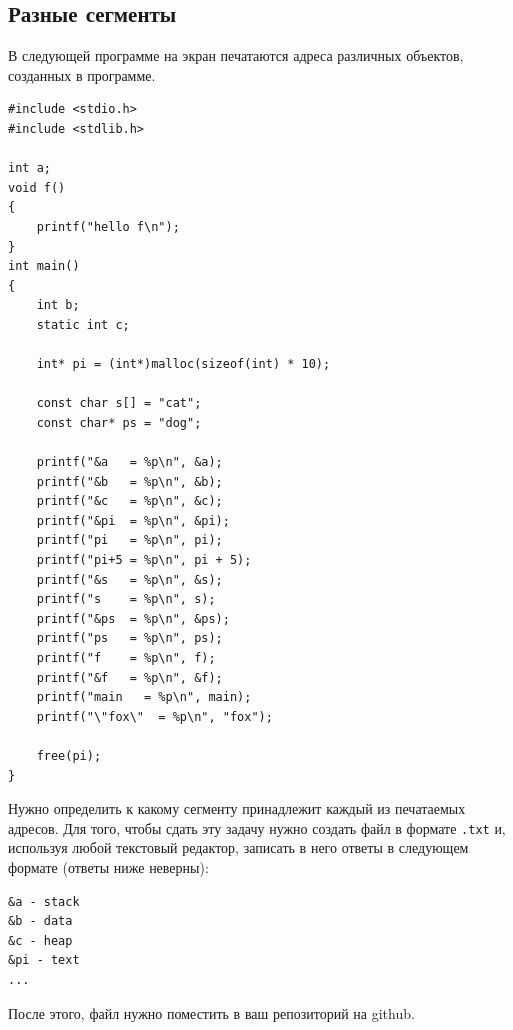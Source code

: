 \documentclass{article}
\begin{document}
\subsection{Разные сегменты}
В следующей программе на экран печатаются адреса различных объектов, созданных в программе.
\begin{lstlisting}
#include <stdio.h>
#include <stdlib.h>

int a;
void f() 
{
    printf("hello f\n");
}
int main()
{
    int b;
    static int c; 
       
    int* pi = (int*)malloc(sizeof(int) * 10);
    
    const char s[] = "cat";
    const char* ps = "dog";
    
    printf("&a   = %p\n", &a);
    printf("&b   = %p\n", &b);
    printf("&c   = %p\n", &c);
    printf("&pi  = %p\n", &pi);
    printf("pi   = %p\n", pi);
    printf("pi+5 = %p\n", pi + 5);
    printf("&s   = %p\n", &s);
    printf("s    = %p\n", s);
    printf("&ps  = %p\n", &ps);
    printf("ps   = %p\n", ps);
    printf("f    = %p\n", f);
    printf("&f   = %p\n", &f);
    printf("main   = %p\n", main);
    printf("\"fox\"  = %p\n", "fox");
    
    free(pi);
}
\end{lstlisting}
Нужно определить к какому сегменту принадлежит каждый из печатаемых адресов.
Для того, чтобы сдать эту задачу нужно создать файл в формате \texttt{.txt} и, используя любой текстовый редактор, записать в него ответы в следующем формате (ответы ниже неверны):
\begin{verbatim}
&a - stack
&b - data
&c - heap
&pi - text
...
\end{verbatim} 
После этого, файл нужно поместить в ваш репозиторий на github.
\end{document}

